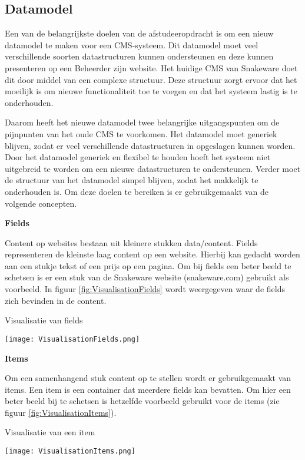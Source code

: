 \subsection{Datamodel}
\label{subsection:Datamodel}
Een van de belangrijkste doelen van de afstudeeropdracht is om een nieuw datamodel te maken voor een CMS-systeem.
Dit datamodel moet veel verschillende soorten datastructuren kunnen ondersteunen en deze kunnen presenteren op een \gls{Beheerder} zijn website.
Het huidige CMS van Snakeware doet dit door middel van een complexe structuur.
Deze structuur zorgt ervoor dat het moeilijk is om nieuwe functionaliteit toe te voegen en dat het systeem lastig is te onderhouden.

\whitespace
Daarom heeft het nieuwe datamodel twee belangrijke uitgangspunten om de pijnpunten van het oude CMS te voorkomen.
Het datamodel moet generiek blijven, zodat er veel verschillende datastructuren in opgeslagen kunnen worden.
Door het datamodel generiek en flexibel te houden hoeft het systeem niet uitgebreid te worden om een nieuwe datastructuren te ondersteunen.
Verder moet de structuur van het datamodel simpel blijven, zodat het makkelijk te onderhouden is.
Om deze doelen te bereiken is er gebruikgemaakt van de volgende concepten.

\whitespace
\textbf{Fields}

\whitespace
Content op websites bestaan uit kleinere stukken data\slash content.
Fields representeren de kleinste laag content op een website. 
Hierbij kan gedacht worden aan een stukje tekst of een prijs op een pagina.
Om bij fields een beter beeld te schetsen is er een stuk van de Snakeware website (snakeware.com) gebruikt als voorbeeld.
In figuur \ref{fig:VisualisationFields} wordt weergegeven waar de fields zich bevinden in de content.

\whitespace[2]
\begin{graphic}
    \captionsetup{type=figure}
    \caption{Visualisatie van fields}
    \texttt{[image: VisualisationFields.png]}
    \label{fig:VisualisationFields}
\end{graphic}

\whitespace
\textbf{Items}

\whitespace
Om een samenhangend stuk content op te stellen wordt er gebruikgemaakt van items.
Een item is een container dat meerdere fields kan bevatten.
Om hier een beter beeld bij te schetsen is hetzelfde voorbeeld gebruikt voor de items (zie figuur \ref{fig:VisualisationItems}).

\whitespace[2]
\begin{graphic}
    \captionsetup{type=figure}
    \caption{Visualisatie van een item}
    \texttt{[image: VisualisationItems.png]}
    \label{fig:VisualisationItems}
\end{graphic}

